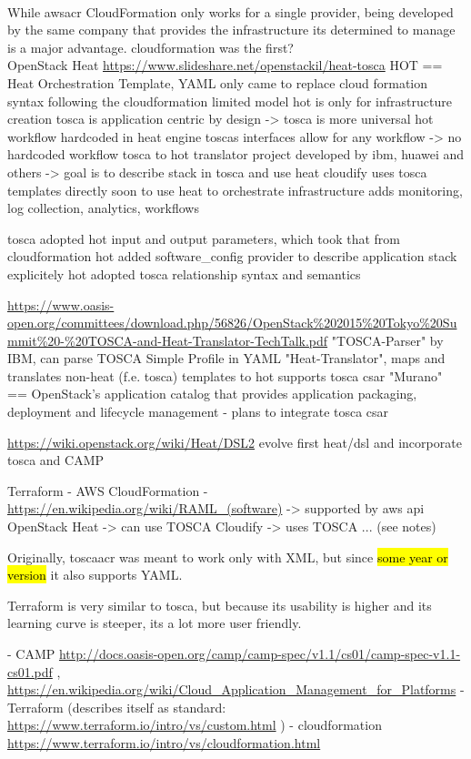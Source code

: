 \\
While \gls{awsacr} CloudFormation only works for a single provider, being developed by the same company that provides the infrastructure its determined to manage is a major advantage.
cloudformation was the first?
\\
OpenStack Heat 
\url{https://www.slideshare.net/openstackil/heat-tosca}
HOT == Heat Orchestration Template, YAML only
came to replace cloud formation syntax
following the cloudformation limited model
hot is only for infrastructure creation
tosca is application centric by design
-> tosca is more universal
hot workflow hardcoded in heat engine
toscas interfaces allow for any workflow -> no hardcoded workflow
tosca to hot translator project developed by ibm, huawei and others -> goal is to describe stack in tosca and use heat
cloudify uses tosca templates directly
  soon to use heat to orchestrate infrastructure
  adds monitoring, log collection, analytics, workflows

tosca adopted hot input and output parameters, which took that from cloudformation
hot added software\_config provider to describe application stack explicitely
hot adopted tosca relationship syntax and semantics

\url{https://www.oasis-open.org/committees/download.php/56826/OpenStack%202015%20Tokyo%20Summit%20-%20TOSCA-and-Heat-Translator-TechTalk.pdf}
"TOSCA-Parser" by IBM, can parse TOSCA Simple Profile in YAML
"Heat-Translator", maps and translates non-heat (f.e. tosca) templates to hot
  supports tosca csar
"Murano" == OpenStack's application catalog that provides application packaging, deployment and lifecycle management - plans to integrate tosca csar

\url{https://wiki.openstack.org/wiki/Heat/DSL2}
evolve first heat/dsl and incorporate tosca and CAMP

Terraform
- AWS CloudFormation
  - \url{https://en.wikipedia.org/wiki/RAML\_(software)} -> supported by aws api
OpenStack Heat -> can use TOSCA
Cloudify -> uses TOSCA
... (see notes)

Originally, \gls{toscaacr} was meant to work only with XML, but since \hl{some year or version} it also supports YAML.

Terraform is very similar to tosca, but because its usability is higher and its learning curve is steeper, its a lot more user friendly.

- CAMP \url{http://docs.oasis-open.org/camp/camp-spec/v1.1/cs01/camp-spec-v1.1-cs01.pdf} , \url{https://en.wikipedia.org/wiki/Cloud\_Application\_Management\_for\_Platforms}
- Terraform (describes itself as standard: \url{https://www.terraform.io/intro/vs/custom.html} )
- cloudformation \url{https://www.terraform.io/intro/vs/cloudformation.html}

